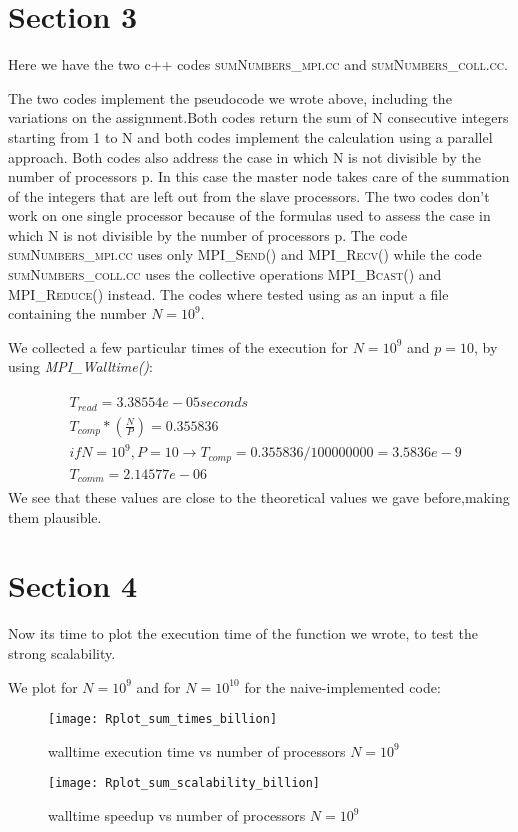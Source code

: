 \documentclass[11pt]{scrartcl} %
\begin{document}
\section{Section 3}
Here we have the two c++ codes \textsc{sumNumbers\_mpi.cc} and \textsc{sumNumbers\_coll.cc}.

The two codes implement the pseudocode we wrote above, including the variations on the assignment.Both codes return the sum of N consecutive integers starting from 1 to N and both codes implement the calculation using a parallel approach. Both codes also address the case in which N is not divisible by the number of processors p. In this case the master node takes care of the summation of the integers that are left out from the slave processors. The two codes don't work on one single processor because of the formulas used to assess the case in which N is not divisible by the number of processors p.
The code \textsc{sumNumbers\_mpi.cc} uses only \textsc{MPI\_Send()} and \textsc{MPI\_Recv()}
while the code \textsc{sumNumbers\_coll.cc} uses the collective operations \textsc{MPI\_Bcast()} and \textsc{MPI\_Reduce()} instead. The codes where tested using as an input a file containing the number $N = 10^9$.

We collected a few particular times of the execution for $N=10^9$ and $p=10$, by using \textit{MPI\_Walltime()}:

\begin{align} 
	\begin{split}
		&T_{read}= 3.38554 e-05 seconds\\
		&T_{comp}*(\frac{N}{P})= 0.355836\\
		&if N=10^9, P=10\rightarrow T_{comp} = 0.355836/100000000 = 3.5836e-9\\
		&T_{comm}=2.14577e-06
	\end{split}					
\end{align}
 We see that these values are close to the theoretical values we gave before,making them plausible.

\section{Section 4}
Now its time to plot the execution time of the function we wrote, to test the strong scalability.

We plot for $N=10^9$ and for $N=10^{10}$ for the naive-implemented code:

\begin{figure}[H] %
	\centering
	\texttt{[image: Rplot\_sum\_times\_billion]} %
	\caption{walltime execution time vs number of processors $N= 10^9$}
\end{figure}
\begin{figure}[H] %
	\centering
	\texttt{[image: Rplot\_sum\_scalability\_billion]} %
	\caption{walltime speedup vs number of processors $N= 10^9$}
\end{figure}
\end{document}
